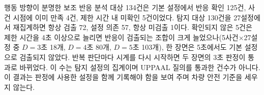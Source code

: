 \begin{revision}


행동 방향이 분명한 보조 반응 분석 대상 134건은 기본 설정에서 반응 확인 125건, 사건 시점에 이미 만족 4건, 제한 시간 내 미확인 5건이었다. 탐지 대상 130건을 27설정에서 재집계하면 항상 검출 72, 설정 의존 57, 항상 미검출 1이다. 확인되지 않은 5건은 제한 시간을 4초 이상으로 늘리면 반응이 검출되는 조합이 크게 늘었으나(5사건$\times$27설정 중 $D=3$초 18개, $D=4$초 80개, $D=5$초 103개), 한 장면은 5초에서도 기본 설정으로 검출되지 않았다. 반복 판단마다 시계를 다시 시작하면 두 장면의 3초 판정이 통과로 바뀌었다. 이 수는 탐지 설정의 집계이며 UPPAAL 질의를 통과한 건수가 아니다. 이 결과는 판정에 사용한 설정을 함께 기록해야 함을 보여 주며 차량 안전 기준을 세우지 않는다.
\end{revision}
